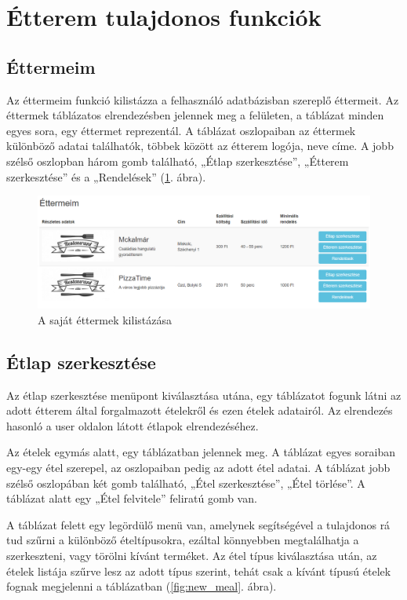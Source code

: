 \section{Étterem tulajdonos funkciók}

\subsection{Éttermeim}

Az éttermeim funkció kilistázza a felhasználó adatbázisban szereplő éttermeit. Az éttermek táblázatos elrendezésben jelennek meg a felületen, a táblázat minden egyes sora, egy éttermet reprezentál. A táblázat oszlopaiban az éttermek különböző adatai találhatók, többek között az étterem logója, neve címe. A jobb szélső oszlopban három gomb található, „Étlap szerkesztése”, „Étterem szerkesztése” és a „Rendelések” (\ref{fig:my_restaurants}. ábra).

\begin{figure}
\centering
\includegraphics[scale=0.5]{kepek/my_restaurants.png}
\caption{A saját éttermek kilistázása}
\label{fig:my_restaurants}
\end{figure}

\subsection{Étlap szerkesztése}

Az étlap szerkesztése menüpont kiválasztása utána, egy táblázatot fogunk látni az adott étterem által forgalmazott ételekről és ezen ételek adatairól. Az elrendezés hasonló a user oldalon látott étlapok elrendezéséhez.

Az ételek egymás alatt, egy táblázatban jelennek meg. A táblázat egyes soraiban egy-egy étel szerepel, az oszlopaiban pedig az adott étel adatai. A táblázat jobb szélső oszlopában két gomb található, „Étel szerkesztése”, „Étel törlése”. A táblázat alatt egy „Étel felvitele” feliratú gomb van.

A táblázat felett egy legördülő menü van, amelynek segítségével a tulajdonos rá tud szűrni a különböző ételtípusokra, ezáltal könnyebben megtalálhatja a szerkeszteni, vagy törölni kívánt terméket. Az étel típus kiválasztása után, az ételek listája szűrve lesz az adott típus szerint, tehát csak a kívánt típusú ételek fognak megjelenni a táblázatban (\ref{fig:new_meal}. ábra).

